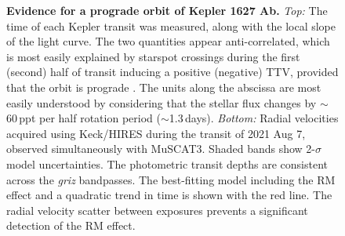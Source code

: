 \documentclass[12pt,modern,twocolumn,tighten]{aastex63}
\begin{document}
\begin{figure}[tp]
	\begin{center}
		\leavevmode
		
		\vspace{-0.1cm}
	\end{center}
	\vspace{-0.7cm}
	\caption{
		{\bf Evidence for a prograde orbit of Kepler 1627 Ab.}
    {\it Top:} 
    The time of each Kepler transit was measured, along with the local
    slope of the light curve.  The two quantities appear
    anti-correlated, which is most easily explained by starspot
    crossings during the first (second) half of transit inducing a
    positive (negative) TTV, provided that the orbit is prograde
    \citep{mazeh_time_2015}.  The units along the abscissa are most
    easily understood by considering that the stellar flux changes by
    $\sim$60\,ppt per half rotation period ($\sim$1.3\,days).
    {\it Bottom:}
    Radial velocities acquired using Keck/HIRES during the transit of
    2021 Aug 7, observed simultaneously with MuSCAT3.  Shaded bands
    show 2-$\sigma$ model uncertainties.  The photometric transit
    depths are consistent across the {\it griz} bandpasses.  The
    best-fitting model including the RM effect and a quadratic trend
    in time is shown with the red line.  The radial velocity scatter
    between exposures prevents a significant detection of the RM
    effect.
    \label{fig:obliquity}
	}
\end{figure}
\end{document}
